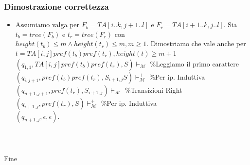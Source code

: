 \documentclass{beamer}
\begin{document}
\begin{frame}
\frametitle{Dimostrazione correttezza}

\begin{itemize}
\item Assumiamo valga per $F_b = TA[i..k,j+1..l]$ e $F_r = TA[i+1..k,j..l]$. Sia $t_b = tree(F_b)$ e $t_r = tree(F_r)$ con $height(t_b) \leq m \wedge height(t_r) \leq m, m \geq 1$. Dimostriamo che vale anche per $t = TA[i,j]pref(t_b)pref(t_r), height(t) \geq m+1$\\
$(q_{1,1},TA[i,j]pref(t_b)pref(t_r),S) \vdash_\mathcal{M} $     \tiny{\%Leggiamo il primo carattere}\normalsize\\ %

$(q_{i,j+1},pref(t_b)pref(t_r),S_{i+1,j}S) \vdash_\mathcal{M}^+ $    \tiny{\%Per ip. Induttiva}\normalsize\\ %
$(q_{n+1,j+1},pref(t_r),S_{i+1,j}) \vdash_\mathcal{M} $                   \tiny{\%Transizioni Right}\normalsize\\ %
$(q_{i+1,j},pref(t_r),S) \vdash_\mathcal{M}^+ $                               \tiny{\%Per ip. Induttiva}\normalsize\\ %
$(q_{n+1,j},\epsilon,\epsilon)$.
\end{itemize}

\end{frame}


\begin{frame}
\frametitle{$\ $}
\Huge{\centerline{Fine}}
\end{frame}


\end{document}
